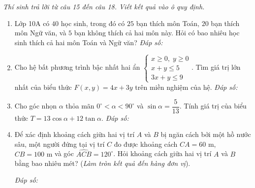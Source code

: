 \documentclass[12pt,a4paper]{article}
\newcommand{\parttitle}[1]{\par\vspace{2pt}{\large\bfseries\color{ink}#1}\par\vspace{1pt}}
\newcommand{\answerbox}{\hfill\textit{Đáp số:}\ \fbox{\rule{0pt}{12pt}\hspace{2.2cm}}}
\begin{document}
\parttitle{PHẦN III. Trắc nghiệm trả lời ngắn}
\textit{Thí sinh trả lời từ câu 15 đến câu 18. Viết kết quả vào ô quy định.}
\begin{enumerate}[resume]
\item Lớp 10A có $40$ học sinh, trong đó có $25$ bạn thích môn Toán, $20$ bạn thích môn Ngữ văn, và $5$ bạn không thích cả hai môn này. Hỏi có bao nhiêu học sinh thích cả hai môn Toán và Ngữ văn?
\answerbox

\item Cho hệ bất phương trình bậc nhất hai ẩn $\begin{cases} x \ge 0,\; y \ge 0 \\ x + y \le 5 \\ 3x + y \le 9 \end{cases}$.
Tìm giá trị lớn nhất của biểu thức $F(x, y) = 4x + 3y$ trên miền nghiệm của hệ.
\answerbox

\item Cho góc nhọn $\alpha$ thỏa mãn $0^\circ < \alpha < 90^\circ$ và $\sin \alpha = \dfrac{5}{13}$. Tính giá trị của biểu thức $T = 13\cos \alpha + 12\tan \alpha$.
\answerbox

\item \begin{minipage}[t]{0.62\linewidth}
Để xác định khoảng cách giữa hai vị trí $A$ và $B$ bị ngăn cách bởi một hồ nước sâu, một người đứng tại vị trí $C$ đo được khoảng cách $CA = 60\text{ m}$, $CB = 100\text{ m}$ và góc $\widehat{ACB} = 120^\circ$. Hỏi khoảng cách giữa hai vị trí $A$ và $B$ bằng bao nhiêu mét? (\textit{Làm tròn kết quả đến hàng đơn vị}).
\vspace{6pt}

\answerbox
\end{minipage}\hfill
\begin{minipage}[t]{0.35\linewidth}
\centering
{}
\end{minipage}
\end{enumerate}
\end{document}
